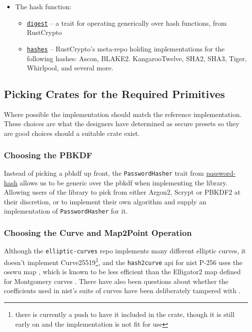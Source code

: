 \begin{itemize}
  \item{
    The hash function:
    \begin{itemize}
      \item{\href{https://github.com/RustCrypto/traits/tree/master/digest}{\texttt{digest}} -- a trait for operating generically over hash functions, from RustCrypto}
      \item{\href{https://github.com/RustCrypto/hashes}{\texttt{hashes}} -- RustCrypto's meta-repo holding implementations for the following hashes: Ascon, BLAKE2. KangarooTwelve, SHA2, SHA3, Tiger, Whirlpool, and several more.}
    \end{itemize}
  }
\end{itemize}

\subsection{Picking Crates for the Required Primitives}
Where possible the implementation should match the reference implementation.
These choices are what the designers have determined as secure presets so they are good choices should a suitable crate exist.

\subsubsection{Choosing the PBKDF}
Instead of picking a \gls{pbkdf} up front, the \texttt{PasswordHasher} trait from \href{https://github.com/RustCrypto/traits/tree/master/password-hash}{password-hash} allows us to be generic over the \gls{pbkdf} when implementing the library.
Allowing users of the library to pick from either Argon2, Scrypt or PBKDF2 at their discretion, or to implement their own algorithm and supply an implementation of \texttt{PasswordHasher} for it.

\subsubsection{Choosing the Curve and \textsf{Map2Point} Operation}
Although the \texttt{elliptic-curves} repo implements many different elliptic curves, it doesn't implement Curve25519\footnote{there is currently a push to have it included in the crate, though it is still early on and the implementation is not fit for use}, and the \texttt{hash2curve} \gls{api} for \gls{nist} P-256 uses the \gls{osswu} map \cite{osswu-map}, which is known to be less efficient than the Elligator2 map defined for Montgomery curves \cite{elligator2}.
There have also been questions about whether the coefficients used in \gls{nist}'s suite of curves have been deliberately tampered with \cite{curve-rigidity}.


